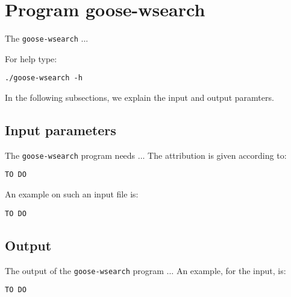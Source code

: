 \section{Program goose-wsearch}
The \texttt{goose-wsearch} ...

For help type:
\begin{lstlisting}
./goose-wsearch -h
\end{lstlisting}
In the following subsections, we explain the input and output paramters.

\subsection{Input parameters}

The \texttt{goose-wsearch} program needs ...
The attribution is given according to:
\begin{lstlisting}
TO DO
\end{lstlisting}

An example on such an input file is:
\begin{lstlisting}
TO DO
\end{lstlisting}

\subsection{Output}
The output of the \texttt{goose-wsearch} program ...
An example, for the input, is:
\begin{lstlisting}
TO DO
\end{lstlisting}
